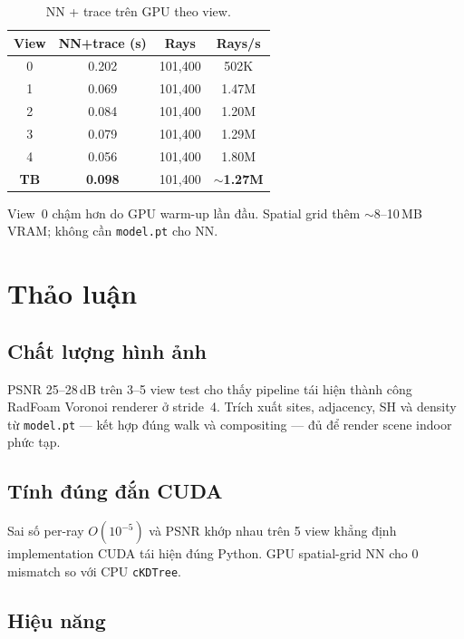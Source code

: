 \documentclass[11pt,a4paper]{article}
\begin{document}
\begin{table}[H]
\centering
\caption{NN + trace trên GPU theo view.}
\label{tab:timing-throughput}
\begin{tabular}{cccc}
\toprule
\textbf{View} & \textbf{NN+trace (s)} & \textbf{Rays} & \textbf{Rays/s} \\
\midrule
0 & 0.202 & 101,400 & 502K \\
1 & 0.069 & 101,400 & 1.47M \\
2 & 0.084 & 101,400 & 1.20M \\
3 & 0.079 & 101,400 & 1.29M \\
4 & 0.056 & 101,400 & 1.80M \\
\midrule
\textbf{TB} & \textbf{0.098} & 101,400 & \textbf{$\sim$1.27M} \\
\bottomrule
\end{tabular}
\end{table}

\noindent View~0 chậm hơn do GPU warm-up lần đầu. Spatial grid thêm $\sim$8--10\,MB VRAM; không cần \texttt{model.pt} cho NN.

\section{Thảo luận}

\subsection{Chất lượng hình ảnh}

PSNR 25--28\,dB trên 3--5 view test cho thấy pipeline tái hiện thành công RadFoam Voronoi renderer ở stride~4. Trích xuất sites, adjacency, SH và density từ \texttt{model.pt} --- kết hợp đúng walk và compositing --- đủ để render scene indoor phức tạp.

\subsection{Tính đúng đắn CUDA}

Sai số per-ray $O(10^{-5})$ và PSNR khớp nhau trên 5 view khẳng định implementation CUDA tái hiện đúng Python. GPU spatial-grid NN cho 0 mismatch so với CPU \texttt{cKDTree}.

\subsection{Hiệu năng}
\end{document}
